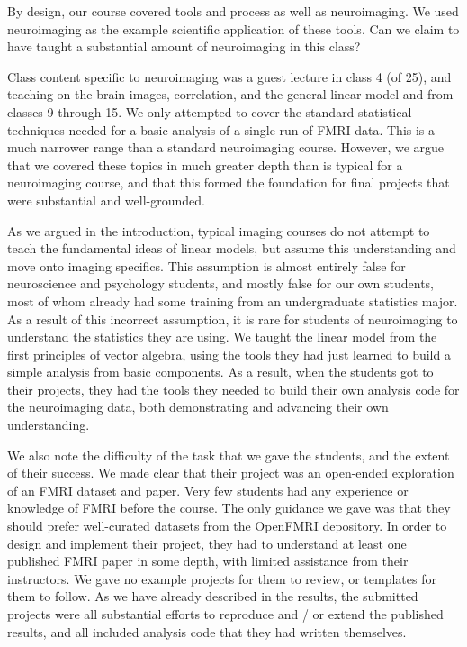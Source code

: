 By design, our course covered tools and process as well as neuroimaging.  We
used neuroimaging as the example scientific application of these tools.  Can
we claim to have taught a substantial amount of neuroimaging in this class?

Class content specific to neuroimaging was a guest lecture in class 4 (of 25),
and teaching on the brain images, correlation, and the general linear model and
from classes 9 through 15.  We only attempted to cover the standard
statistical techniques needed for a basic analysis of a single run of FMRI
data.  This is a much narrower range than a standard neuroimaging course.
However, we argue that we covered these topics in much greater depth than is
typical for a neuroimaging course, and that this formed the foundation for
final projects that were substantial and well-grounded.

As we argued in the introduction, typical imaging courses do not attempt to
teach the fundamental ideas of linear models, but assume this understanding
and move onto imaging specifics.  This assumption is almost entirely false for
neuroscience and psychology students, and mostly false for our own
students, most of whom already had some training from an undergraduate
statistics major. As a result of this incorrect assumption, it is rare for
students of neuroimaging to understand the statistics they are using.  We
taught the linear model from the first principles of vector algebra, using the
tools they had just learned to build a simple analysis from basic components.
As a result, when the students got to their projects, they had the tools they
needed to build their own analysis code for the neuroimaging data, both
demonstrating and advancing their own understanding.

We also note the difficulty of the task that we gave the students, and the
extent of their success.  We made clear that their project was an open-ended
exploration of an FMRI dataset and paper.  Very few students had any
experience or knowledge of FMRI before the course. The only guidance we gave
was that they should prefer well-curated datasets from the OpenFMRI
depository.  In order to design and implement their project, they had to
understand at least one published FMRI paper in some depth, with limited
assistance from their instructors.  We gave no example projects for them to
review, or templates for them to follow.  As we have already described in the
results, the submitted projects were all substantial efforts to reproduce and
/ or extend the published results, and all included analysis code that they
had written themselves.

